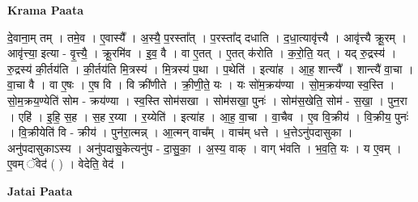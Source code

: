 \documentclass[17pt]{extarticle}
\begin{document}
\textbf{Krama Paata} \newline

दे॒वाना॒म् तम् । तमे॒व । ए॒वास्यै᳚ । अ॒स्यै॒ प॒रस्ता᳚त् । प॒रस्ता᳚द् दधाति । द॒धा॒त्यावृ॑त्त्यै । आवृ॑त्त्यै क्रू॒रम् । आवृ॑त्त्या॒ इत्या - वृ॒त्त्यै॒ । क्रू॒रमि॑व । इ॒व॒ वै । वा ए॒तत् । ए॒तत् क॑रोति । क॒रो॒ति॒ यत् । यद् रु॒द्रस्य॑ । 
रु॒द्रस्य॑ की॒र्तय॑ति । की॒र्तय॑ति मि॒त्रस्य॑ । मि॒त्रस्य॑ प॒था । प॒थेति॑ । इत्या॑ह । आ॒ह॒ शान्त्यै᳚ । शान्त्यै॑ वा॒चा । वा॒चा वै । वा ए॒षः । ए॒ष वि । वि क्री॑णीते । क्री॒णी॒ते॒ यः । यः सो॑म॒क्रय॑ण्या । सो॒म॒क्रय॑ण्या स्व॒स्ति । 
सो॒म॒क्रय॒ण्येति॑ सोम - क्रय॑ण्या । स्व॒स्ति सोम॑सखा । सोम॑सखा॒ पुनः॑ । सोम॑स॒खेति॒ सोम॑ - स॒खा॒ । पुन॒रा । एहि॑ । इ॒हि॒ स॒ह । स॒ह र॒य्या । र॒य्येति॑ । इत्या॑ह । आ॒ह॒ वा॒चा । वा॒चैव । ए॒व वि॒क्रीय॑ । वि॒क्रीय॒ पुनः॑ । वि॒क्रीयेति॑ वि - क्रीय॑ । पुन॑रा॒त्मन्न् । आ॒त्मन् वाच᳚म् । वाच॑म् धत्ते । ध॒त्तेऽनु॑पदासुका । अनु॑पदासुकाऽस्य । अनु॑पदासु॒केत्यनु॑प - दा॒सु॒का॒ । अ॒स्य॒ वाक् । वाग् भ॑वति । भ॒व॒ति॒ यः । य ए॒वम् । ए॒वम् ॅवेद॑ ( ) । वेदेति॒ वेद॑ । \newline

\textbf{Jatai Paata} \newline
\end{document}
